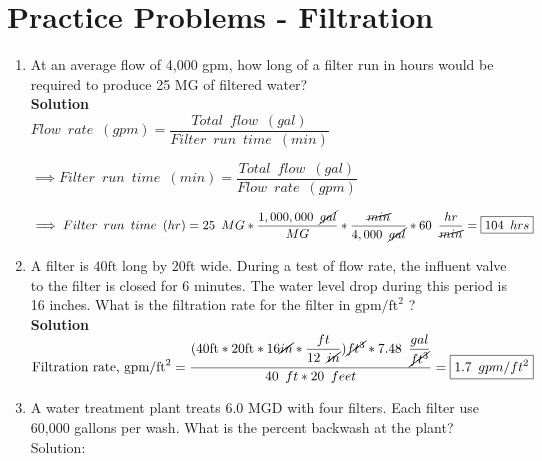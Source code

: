 \section*{Practice Problems - Filtration} 


\begin{enumerate}
	\item At an average flow of 4,000 gpm, how long of a filter run in hours would be required to produce 25 MG of filtered water?\\
	\vspace{0.2cm}
	\textbf{Solution}\\
	
	$Flow \enspace rate \enspace (gpm)=\dfrac{Total \enspace flow \enspace (gal)}{Filter \enspace run \enspace time \enspace (min)}$

\vspace{0.3cm}

$\implies Filter \enspace run \enspace time \enspace (min)=\dfrac{Total \enspace flow \enspace (gal)}{Flow \enspace rate \enspace (gpm)}$\\

\vspace{0.3cm}

$\implies Filter \enspace run \enspace time \enspace (hr)=25 \enspace MG*\dfrac{1,000,000 \enspace \cancel{gal}}{MG}*\dfrac{\cancel{min}}{4,000 \enspace \cancel{gal}}*60 \enspace \dfrac{hr}{\cancel{min}}=\boxed{104 \enspace hrs}$
\vspace{0.3cm}
	
	\item A filter is $40 \mathrm{ft}$ long by $20 \mathrm{ft}$ wide. During a test of flow rate, the influent valve to the filter is closed for 6 minutes. The water level drop during this period is 16 inches. What is the filtration rate for the filter in $\mathrm{gpm} / \mathrm{ft}^{2}$ ?\\
	\vspace{0.2cm}
	\textbf{Solution}\\
	
	$\text{Filtration rate, } \mathrm{gpm} / \mathrm{ft}^{2} = 
\dfrac{(
40 \mathrm{ ft}*20 \mathrm{ ft} * 16 \mathrm{\cancel{in}}*
\dfrac{ft}{12 \enspace \cancel{in}}
)
\cancel{ft^3}*7.48 \enspace 
\dfrac
{gal}
{\cancel{ft^3}}}
{40 \enspace ft * 20 \enspace feet}= \boxed{1.7\enspace gpm/ft^2}$\\
	\vspace{0.3cm}
\item A water treatment plant treats 6.0 MGD with four filters. Each filter use 60,000 gallons per wash. What is the percent backwash at the plant?\\
\vspace{0.2cm}
Solution:\\
\vspace{0.2cm}


\end{enumerate}
